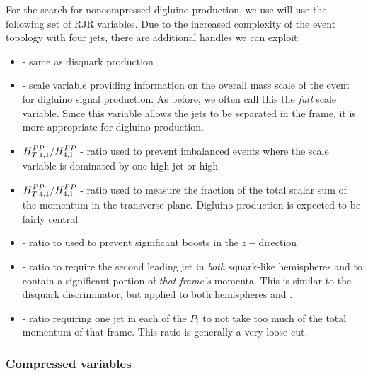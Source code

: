 For the search for noncompressed digluino production, we use will use the following set of RJR variables.
Due to the increased complexity of the event topology with four jets, there are additional handles we can exploit:
\begin{itemize}
\item {} - same as disquark production
\item {} - scale variable providing information on the overall mass scale of the event for digluino signal production.  As before, we often call this the \textit{full} scale variable.  Since this variable allows the jets to be separated in the \PP frame, it is more appropriate for digluino production.
\item $H^{{PP}}_{T,1,1}/H^{{PP}}_{4,1} $ - ratio used to prevent imbalanced events where the scale variable is dominated by one high \pT jet or high \met
\item $H^{{PP}}_{T,4,1}/H^{{PP}}_{4,1} $ - ratio used to measure the fraction of the total scalar sum of the momentum in the transverse plane.  Digluino production is expected to be fairly central
\item \pzlabratioFour - ratio to used to prevent significant boosts in the $z-$direction
\item \minjTwoGuy - ratio to require the second leading jet in \textit{both} squark-like hemispheres \Ca and \Cb to contain a significant portion of \textit{that frame's} momenta.  This is similar to the \ptjTworatio disquark discriminator, but applied to both hemispheres \Ca and \Cb.
\item \maxjTwoGuy - ratio requiring one jet in each of the $P_i$ to not take too much of the total momentum of that frame.  This ratio is generally a very loose cut.
\end{itemize}

\subsubsection{Compressed variables}

